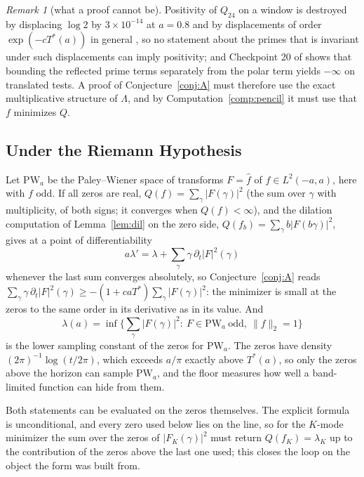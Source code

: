 \documentclass[11pt]{article}
\theoremstyle{definition}
\theoremstyle{remark}
\newtheorem{remark}[theorem]{Remark}
\newcommand{\Tst}{T^{*}}
\newcommand{\PW}{\mathrm{PW}}
\begin{document}
\begin{remark}[what a proof cannot be]
Positivity of $Q_{24}$ on a window is destroyed by displacing $\log2$ by $3\times10^{-14}$ at $a=0.8$ and by displacements of order $\exp(-c\Tst(a))$ in general \cite{michaels-folds,michaels-repo}, so no statement about the primes that is invariant under such displacements can imply positivity; and Checkpoint 20 of \cite{michaels-atlas} shows that bounding the reflected prime terms separately from the polar term yields $-\infty$ on translated tests. A proof of Conjecture~\ref{conj:A} must therefore use the exact multiplicative structure of $\Lambda$, and by Computation~\ref{comp:pencil} it must use that $f$ minimizes $Q$.
\end{remark}

\subsection{Under the Riemann Hypothesis}\label{sec:rh}

Let $\PW_a$ be the Paley--Wiener space of transforms $F=\hat f$ of $f\in L^2(-a,a)$, here with $f$ odd. If all zeros are real, $Q(f)=\sum_\gamma|F(\gamma)|^2$ (the sum over $\gamma$ with multiplicity, of both signs; it converges when $Q(f)<\infty$), and the dilation computation of Lemma~\ref{lem:dil} on the zero side, $Q(f_b)=\sum_\gamma b|F(b\gamma)|^2$, gives at a point of differentiability
\[
a\lambda'=\lambda+\sum_\gamma\gamma\,\partial_t|F|^2(\gamma)
\]
whenever the last sum converges absolutely, so Conjecture~\ref{conj:A} reads $\sum_\gamma\gamma\,\partial_t|F|^2(\gamma)\ge-(1+ca\Tst)\sum_\gamma|F(\gamma)|^2$: the minimizer is small at the zeros to the same order in its derivative as in its value. And
\[
\lambda(a)=\inf\{\textstyle\sum_\gamma|F(\gamma)|^2:\ F\in\PW_a\ \text{odd},\ \|f\|_2=1\}
\]
is the lower sampling constant of the zeros for $\PW_a$. The zeros have density $(2\pi)^{-1}\log(t/2\pi)$, which exceeds $a/\pi$ exactly above $\Tst(a)$, so only the zeros above the horizon can sample $\PW_a$, and the floor measures how well a band-limited function can hide from them.

Both statements can be evaluated on the zeros themselves. The explicit formula is unconditional, and every zero used below lies on the line, so for the $K$-mode minimizer the sum over the zeros of $|F_K(\gamma)|^2$ must return $Q(f_K)=\lambda_K$ up to the contribution of the zeros above the last one used; this closes the loop on the object the form was built from.
\end{document}
